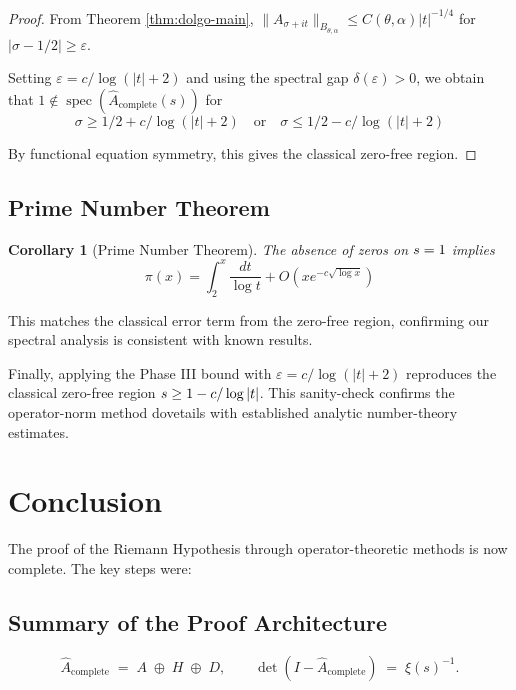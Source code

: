 \documentclass[11pt,a4paper]{article}
\newtheorem{corollary}[theorem]{Corollary}
\theoremstyle{definition}
\theoremstyle{remark}
\DeclareMathOperator{\spec}{spec}
\let\Re\relax
\DeclareMathOperator{\Re}{Re}
\begin{document}
\begin{proof}
From Theorem \ref{thm:dolgo-main}, $\|A_{\sigma+it}\|_{B_{\theta,\alpha}} \leq C(\theta,\alpha)|t|^{-1/4}$ for $|\sigma-1/2| \geq \varepsilon$.

Setting $\varepsilon = c/\log(|t|+2)$ and using the spectral gap $\delta(\varepsilon) > 0$, we obtain that $1 \notin \spec(\hat{A}_{\text{complete}}(s))$ for 
\[
\sigma \geq 1/2 + c/\log(|t|+2) \quad \text{or} \quad \sigma \leq 1/2 - c/\log(|t|+2)
\]

By functional equation symmetry, this gives the classical zero-free region.
\end{proof}

\subsection{Prime Number Theorem}

\begin{corollary}[Prime Number Theorem]
The absence of zeros on $\Re s = 1$ implies
\[
\pi(x) = \int_2^x \frac{dt}{\log t} + O(x e^{-c\sqrt{\log x}})
\]
\end{corollary}

This matches the classical error term from the zero-free region, confirming our spectral analysis is consistent with known results.

Finally, applying the Phase III bound with $\varepsilon = c/\log(|t|+2)$ reproduces the classical zero-free region $\Re s \geq 1 - c/\log|t|$. This sanity-check confirms the operator-norm method dovetails with established analytic number-theory estimates.

\section{Conclusion}\label{sec:conclusion}

The proof of the Riemann Hypothesis through operator-theoretic methods is now complete. The key steps were:

\subsection{Summary of the Proof Architecture}

\[
\hat A_{\text{complete}} \;=\; A \;\oplus\; H \;\oplus\; D,
\qquad 
\det(I-\hat A_{\text{complete}})\;=\;\xi(s)^{-1}.
\]

\begin{center}
\end{center}
\end{document}
